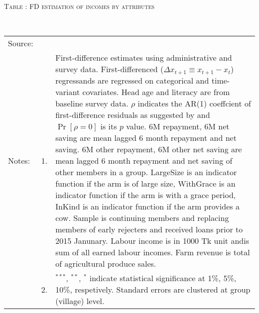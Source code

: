 \hspace{-1cm}\begin{minipage}[t]{14cm}
\hfil\textsc{\normalsize Table \thetable: FD estimation of incomes by attributes \label{tab FD incomes attributes original HH}}\\
\setlength{\tabcolsep}{1pt}
\setlength{\baselineskip}{8pt}
\renewcommand{\arraystretch}{.55}
\hfil{}\\
\renewcommand{\arraystretch}{.8}
\setlength{\tabcolsep}{1pt}
\begin{tabular}{>{\hfill\scriptsize}p{1cm}<{}>{\hfill\scriptsize}p{.25cm}<{}>{\scriptsize}p{12cm}<{\hfill}}
Source:& \multicolumn{2}{l}{\scriptsize Estimated with GUK administrative and survey data.}\\
Notes: & 1. & First-difference estimates using administrative and survey data. First-differenced ($\Delta x_{t+1}\equiv x_{t+1} - x_{t}$) regressands are regressed on categorical and time-variant covariates. Head age and literacy are from baseline survey data. $\rho$ indicates the AR(1) coeffcient of first-difference residuals as suggested by \citet[][10.71]{Wooldridge2010} and $\Pr[\rho=0]$ is its $p$ value. \textsf{6M repayment, 6M net saving} are mean lagged 6 month repayment and net saving. \textsf{6M other repayment, 6M other net saving} are mean lagged 6 month repayment and net saving of other members in a group. \textsf{LargeSize} is an indicator function if the arm is of large size, \textsf{WithGrace} is an indicator function if the arm is with a grace period, \textsf{InKind} is an indicator function if the arm provides a cow. Sample is continuing members and replacing members of early rejecters and received loans prior to 2015 Janunary. Labour income is in 1000 Tk unit andis sum of all earned labour incomes. Farm revenue is total of agricultural produce sales. \\
& 2. & ${}^{***}$, ${}^{**}$, ${}^{*}$ indicate statistical significance at 1\%, 5\%, 10\%, respetively. Standard errors are clustered at group (village) level.
\end{tabular}
\end{minipage}








